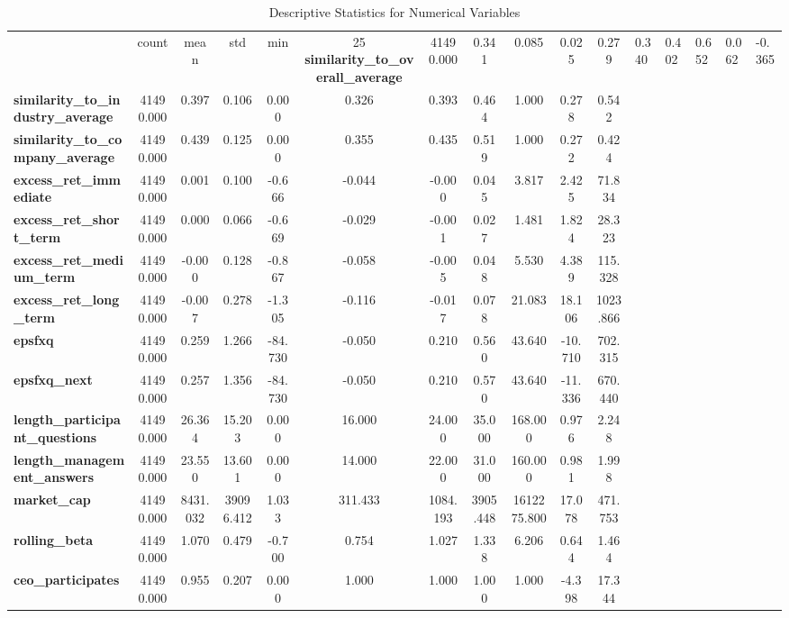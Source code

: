 \begin{table}
\caption{Descriptive Statistics for Numerical Variables}
\label{tab:descriptive_numerical}
\begin{tabular}{lcccccccccc}
\toprule
 & count & mean & std & min & 25%
\midrule
\textbf{similarity_to_overall_average} & 41490.000 & 0.341 & 0.085 & 0.025 & 0.279 & 0.340 & 0.402 & 0.652 & 0.062 & -0.365 \\
\textbf{similarity_to_industry_average} & 41490.000 & 0.397 & 0.106 & 0.000 & 0.326 & 0.393 & 0.464 & 1.000 & 0.278 & 0.542 \\
\textbf{similarity_to_company_average} & 41490.000 & 0.439 & 0.125 & 0.000 & 0.355 & 0.435 & 0.519 & 1.000 & 0.272 & 0.424 \\
\textbf{excess_ret_immediate} & 41490.000 & 0.001 & 0.100 & -0.666 & -0.044 & -0.000 & 0.045 & 3.817 & 2.425 & 71.834 \\
\textbf{excess_ret_short_term} & 41490.000 & 0.000 & 0.066 & -0.669 & -0.029 & -0.001 & 0.027 & 1.481 & 1.824 & 28.323 \\
\textbf{excess_ret_medium_term} & 41490.000 & -0.000 & 0.128 & -0.867 & -0.058 & -0.005 & 0.048 & 5.530 & 4.389 & 115.328 \\
\textbf{excess_ret_long_term} & 41490.000 & -0.007 & 0.278 & -1.305 & -0.116 & -0.017 & 0.078 & 21.083 & 18.106 & 1023.866 \\
\textbf{epsfxq} & 41490.000 & 0.259 & 1.266 & -84.730 & -0.050 & 0.210 & 0.560 & 43.640 & -10.710 & 702.315 \\
\textbf{epsfxq_next} & 41490.000 & 0.257 & 1.356 & -84.730 & -0.050 & 0.210 & 0.570 & 43.640 & -11.336 & 670.440 \\
\textbf{length_participant_questions} & 41490.000 & 26.364 & 15.203 & 0.000 & 16.000 & 24.000 & 35.000 & 168.000 & 0.976 & 2.248 \\
\textbf{length_management_answers} & 41490.000 & 23.550 & 13.601 & 0.000 & 14.000 & 22.000 & 31.000 & 160.000 & 0.981 & 1.998 \\
\textbf{market_cap} & 41490.000 & 8431.032 & 39096.412 & 1.033 & 311.433 & 1084.193 & 3905.448 & 1612275.800 & 17.078 & 471.753 \\
\textbf{rolling_beta} & 41490.000 & 1.070 & 0.479 & -0.700 & 0.754 & 1.027 & 1.338 & 6.206 & 0.644 & 1.464 \\
\textbf{ceo_participates} & 41490.000 & 0.955 & 0.207 & 0.000 & 1.000 & 1.000 & 1.000 & 1.000 & -4.398 & 17.344 \\

\end{tabular}
\end{table}

